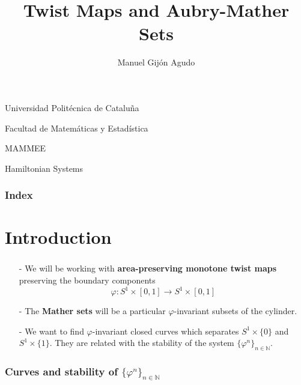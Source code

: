 \documentclass[12 pt]{beamer}
\title{Twist Maps and Aubry-Mather Sets}
\author{\normalsize{Manuel Gijón Agudo}}
\date{}
\begin{document}
\begin{frame}
    \begin{center}

        Universidad Politécnica de Cataluña
        
        Facultad de Matemáticas y Estadística
        
        MAMMEE
        
        \scriptsize{Hamiltonian Systems}
        
        \maketitle    
        
        \small{}
    \end{center}
  
\end{frame}


\begin{frame}{0}
    \frametitle{Index}     
    \tableofcontents
\end{frame}


\section{Introduction}

\begin{frame}{1}
    \frametitle{}
   
  	\begin{itemize}
  		\item[-] We will be working with \textbf{area-preserving monotone twist maps} preserving the boundary components
			$$
				\varphi: S^{1} \times [0, 1] \longrightarrow S^{1} \times [0, 1]
			$$
		\item[-] The \textbf{Mather sets} will be a particular $\varphi$-invariant subsets of the cylinder.
		\item[-] We want to find $\varphi$-invariant closed curves which separates $S^{1} \times \{ 0 \}$ and $S^{1} \times \{ 1 \}$. They are related with the stability of the system $\{ \varphi^{n} \}_{n \in \mathbb{N}}$.	
  	\end{itemize}

\end{frame}

\begin{frame}{2}
    \frametitle{Curves and stability of $\{ \varphi^{n} \}_{n \in \mathbb{N}}$}
   
\end{frame}
\end{document}
